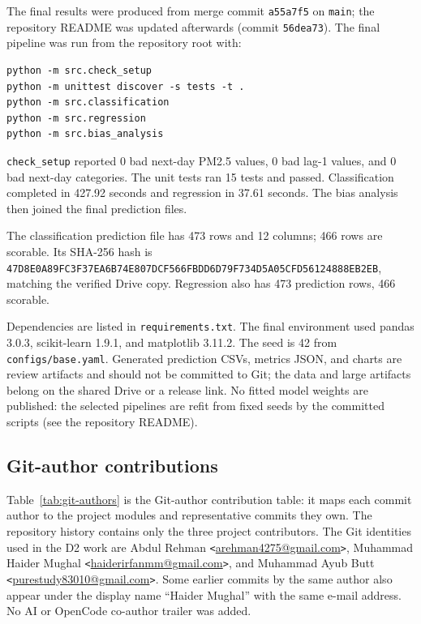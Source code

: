 \documentclass[11pt]{article}
\begin{document}
The final results were produced from merge commit \texttt{a55a7f5} on \texttt{main}; the repository README was updated afterwards (commit \texttt{56dea73}). The final pipeline was run from the repository root with:

\begin{verbatim}
python -m src.check_setup
python -m unittest discover -s tests -t .
python -m src.classification
python -m src.regression
python -m src.bias_analysis
\end{verbatim}

\texttt{check\_setup} reported 0 bad next-day PM2.5 values, 0 bad lag-1 values, and 0 bad next-day categories. The unit tests ran 15 tests and passed. Classification completed in 427.92 seconds and regression in 37.61 seconds. The bias analysis then joined the final prediction files.

The classification prediction file has 473 rows and 12 columns; 466 rows are scorable. Its SHA-256 hash is \texttt{47D8E0A89FC3F37EA6B74E807DCF566FBDD6D79F734D5A05CFD56124888EB2EB}, matching the verified Drive copy. Regression also has 473 prediction rows, 466 scorable.

Dependencies are listed in \texttt{requirements.txt}. The final environment used pandas 3.0.3, scikit-learn 1.9.1, and matplotlib 3.11.2. The seed is 42 from \texttt{configs/base.yaml}. Generated prediction CSVs, metrics JSON, and charts are review artifacts and should not be committed to Git; the data and large artifacts belong on the shared Drive or a release link. No fitted model weights are published: the selected pipelines are refit from fixed seeds by the committed scripts (see the repository README).

\subsection{Git-author contributions}

Table~\ref{tab:git-authors} is the Git-author contribution table: it maps each commit author to the project modules and representative commits they own. The repository history contains only the three project contributors. The Git identities used in the D2 work are Abdul Rehman \texttt{<}\url{arehman4275@gmail.com}\texttt{>}, Muhammad Haider Mughal \texttt{<}\url{haiderirfanmm@gmail.com}\texttt{>}, and Muhammad Ayub Butt \texttt{<}\url{purestudy83010@gmail.com}\texttt{>}. Some earlier commits by the same author also appear under the display name ``Haider Mughal'' with the same e-mail address. No AI or OpenCode co-author trailer was added.
\end{document}
